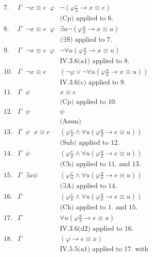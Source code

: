 \begin{enumerate}[1.]
\begin{enumerate}[(i)]
\begin{enumerate}
\[\begin{array}{lll}
7. & \Gamma \;\; \neg x \equiv e \;\; \varphi & \neg (\varphi\frac{e}{x} \rightarrow x \equiv e) \\
\  & \      & \mbox{(Cp) applied to 6.} \\
8. & \Gamma \;\; \neg x \equiv e \;\; \varphi & \exists u \neg (\varphi\frac{u}{x} \rightarrow x \equiv u) \\
\  & \      & \mbox{($\exists$S) applied to 7.} \\
9. & \Gamma \;\; \neg x \equiv e \;\; \varphi & \neg \forall u (\varphi\frac{u}{x} \rightarrow x \equiv u) \\
\  & \      & \mbox{IV.3.6(a1) applied to 8.} \\
10.& \Gamma \;\; \neg x \equiv e & (\neg \varphi \lor \neg \forall u (\varphi\frac{u}{x} \rightarrow x \equiv u)) \\
\  & \      & \mbox{IV.3.6(c) applied to 9.} \\
11.& \Gamma \;\; \psi & x \equiv e \\
\  & \      & \mbox{(Cp) applied to 10.} \\
12.& \Gamma \;\; \psi & \psi \\
\  & \      & \mbox{(Assm)} \\
13.& \Gamma \;\; \psi \;\; x \equiv e & (\varphi\frac{e}{x} \land \forall u (\varphi\frac{u}{x} \rightarrow e \equiv u)) \\
\  & \      & \mbox{(Sub) applied to 12.} \\
14.& \Gamma \;\; \psi & (\varphi\frac{e}{x} \land \forall u (\varphi\frac{u}{x} \rightarrow e \equiv u)) \\
\  & \      & \mbox{(Ch) applied to 11. and 13.} \\
15.& \Gamma \;\; \exists x \psi & (\varphi\frac{e}{x} \land \forall u (\varphi\frac{u}{x} \rightarrow e \equiv u)) \\
\  & \      & \mbox{($\exists$A) applied to 14.} \\
16.& \Gamma & (\varphi\frac{e}{x} \land \forall u (\varphi\frac{u}{x} \rightarrow e \equiv u)) \\
\  & \      & \mbox{(Ch) applied to 1. and 15.} \\
17.& \Gamma & \forall u (\varphi\frac{u}{x} \rightarrow e \equiv u) \\
\  & \      & \mbox{IV.3.6(d2) applied to 16.} \\
18.& \Gamma & (\varphi \rightarrow e \equiv x) \\
\  & \      & \mbox{IV.5.5(a1) applied to 17. with} \\

\end{array}\]
\end{enumerate}
\end{enumerate}
\end{enumerate}

